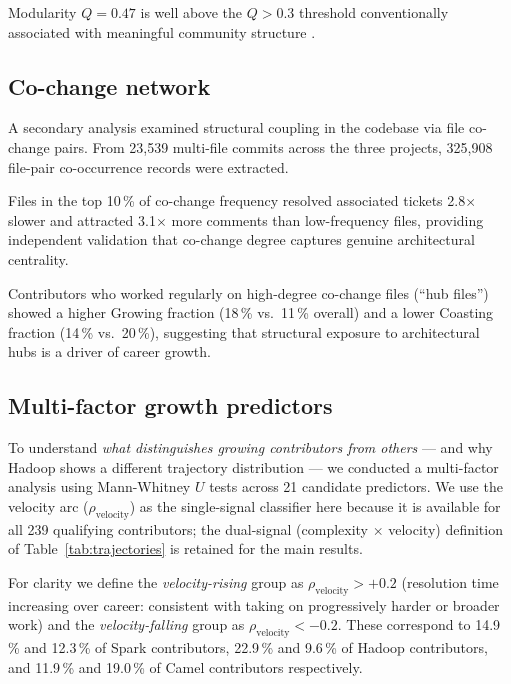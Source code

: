 \documentclass[12pt,a4paper]{article}
\begin{document}
Modularity $Q = 0.47$ is well above the $Q > 0.3$ threshold
conventionally associated with meaningful community structure
\citep{Newman2004}.

\subsection{Co-change network}
\label{sec:cochange}

A secondary analysis examined structural coupling in the codebase
via file co-change pairs.
From 23,539 multi-file commits across the three projects,
325,908 file-pair co-occurrence records were extracted.

Files in the top 10\,\% of co-change frequency resolved associated
tickets 2.8$\times$ slower and attracted 3.1$\times$ more comments
than low-frequency files, providing independent validation that
co-change degree captures genuine architectural centrality.

Contributors who worked regularly on high-degree co-change files
(``hub files'') showed a higher Growing fraction (18\,\% vs.\
11\,\% overall) and a lower Coasting fraction (14\,\% vs.\ 20\,\%),
suggesting that structural exposure to architectural hubs is a
driver of career growth.

\subsection{Multi-factor growth predictors}
\label{sec:multifactor}

To understand \textit{what distinguishes growing contributors from others}
--- and why Hadoop shows a different trajectory distribution ---
we conducted a multi-factor analysis using Mann-Whitney $U$ tests
across 21 candidate predictors.
We use the velocity arc ($\rho_{\text{velocity}}$) as the single-signal
classifier here because it is available for all 239 qualifying
contributors; the dual-signal (complexity $\times$ velocity) definition
of Table~\ref{tab:trajectories} is retained for the main results.

For clarity we define the \textit{velocity-rising} group as
$\rho_{\text{velocity}} > +0.2$
(resolution time increasing over career: consistent with taking on
progressively harder or broader work) and the \textit{velocity-falling}
group as $\rho_{\text{velocity}} < -0.2$.
These correspond to 14.9\,\% and 12.3\,\% of Spark contributors,
22.9\,\% and 9.6\,\% of Hadoop contributors, and 11.9\,\% and 19.0\,\%
of Camel contributors respectively.
\end{document}

